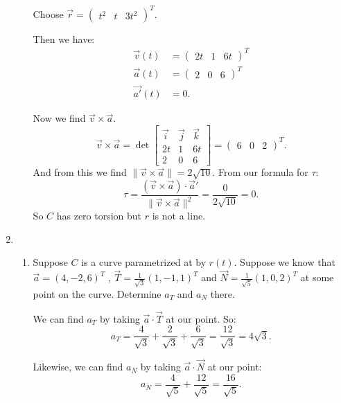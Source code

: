 \documentclass{article}
\begin{document}
\begin{enumerate}
\begin{enumerate}[label= (\alph*)]
        Choose $\vec{r}=\begin{pmatrix} t^2&t&3t^2 \end{pmatrix}^{T}$.

        Then we have:
        \begin{align*}
            \vec{v}(t)&=\begin{pmatrix} 2t&1&6t \end{pmatrix} ^{T}\\
            \vec{a}(t)&= \begin{pmatrix} 2&0&6 \end{pmatrix}^{T}  \\
            \vec{a'}(t)&= 0 
        .\end{align*}

        Now we find $\vec{v}\times \vec{a}$.
        \[
            \vec{v}\times \vec{a}=
            \det\begin{bmatrix} 
                \vec{i}&\vec{j}&\vec{k}\\
                2t&1&6t\\
                2&0&6
            \end{bmatrix} 
            =\begin{pmatrix} 6&0&2 \end{pmatrix} ^{T}.
        \] 
        And from this we find $\|\vec{v}\times \vec{a}\|=2\sqrt{10} $. From our formula for $\tau$:
        \[
            \tau=\frac{(\vec{v}\times \vec{a})\cdot\vec{a}'}{\|\vec{v}\times \vec{a}\|^2}
            =\frac{0}{2\sqrt{10} }=0
        .\] 
        So $C$ has zero torsion but $r$ is not a line.
        \newpage
    \end{enumerate}
\item
    \begin{enumerate}[label= (\alph*)] 
        \item Suppose $C$ is a curve parametrized at by $r (t)$. Suppose we know that
        $\vec a = (4, -2, 6)^T$ ,  $\vec T = \frac{1}{\sqrt{3} } (1, -1, 1)^T$ 
        and  $\vec N = \frac{1}{\sqrt{5} } (1, 0, 2)^T$ at some point on the
        curve. Determine ${a}_T$ and ${a}_N$ there.

            We can find $a_T$ by taking $\vec{a}\cdot\vec{T}$ at our point. So:
            \[
            a_T=\frac{4}{\sqrt{3} }+\frac{2}{\sqrt{3} }+\frac{6}{\sqrt{3} }=\frac{12}{\sqrt{3} }=4\sqrt{3} 
            .\] 

            Likewise, we can find $a_N$ by taking $\vec{a}\cdot\vec{N}$ at our point:
            \[
            a_N=\frac{4}{\sqrt{5} }+\frac{12}{\sqrt{5} }=\frac{16}{\sqrt{5} }
            .\] 


\end{enumerate}
\end{enumerate}
\end{document}
